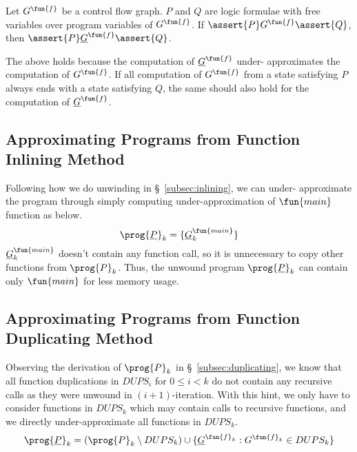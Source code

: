 \begin{proposition}
  Let $G^\fun{f}$ be a control flow graph. $P$ and $Q$ are logic formulae with
  free variables over program variables of $G^\fun{f}$. If $\assert{P}
  G^\fun{f} \assert{Q}$, then 
  $\assert{P} \underline{G}^\fun{f} \assert{Q}$.
\end{proposition}
The above holds because the computation of $\underline{G}^\fun{f}$ under-
approximates the computation of $G^\fun{f}$.
If all computation of $G^\fun{f}$ from a state satisfying $P$ always ends with
a state satisfying $Q$,
the same should also hold for the computation of $\underline{G}^\fun{f}$.


\subsection{Approximating Programs from Function Inlining Method}
Following how we do unwinding in \S~\ref{subsec:inlining}, we can under-
approximate the program through simply computing under-approximation of
$\fun{main}$ function as below.
\[
\prog{\underline{P}}_k = \{\underline{G}^\fun{main}_k\}
\]
$\underline{G}^\fun{main}_k$ doesn't contain any function call,
so it is unnecessary to copy other functions from $\prog{P}_k$.
Thus, the unwound program $\prog{\underline{P}}_k$ can contain only
$\fun{main}$ for less memory usage.


\subsection{Approximating Programs from Function Duplicating Method}
Observing the derivation of $\prog{P}_k$ in \S~\ref{subsec:duplicating},
we know that all function duplications in $DUPS_i$ for $0 \leq i < k$
do not contain any recursive calls as they were unwound in $(i+1)$-iteration.
With this hint, we only have to consider functions in $DUPS_k$ which may
contain calls to recursive functions,
and we directly under-approximate all functions in $DUPS_k$.
\[
\prog{\underline{P}}_k = (\prog{P}_k \setminus DUPS_k)
             \cup \{\underline{G}^{\fun{f}_k}:G^{\fun{f}_k} \in DUPS_k\}
\]

